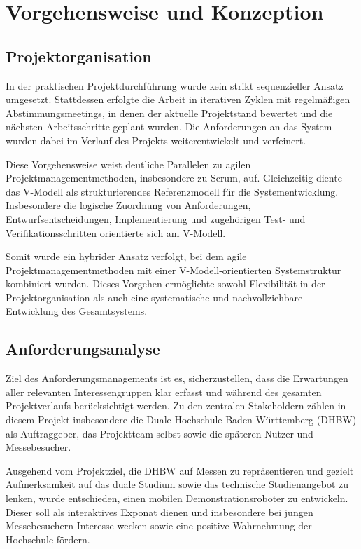 \chapter{Vorgehensweise und Konzeption}
\label{cha:Vorgehensweise und Konzeption}

\section{Projektorganisation}
\label{cha:Projektorganisation}

In der praktischen Projektdurchführung wurde kein strikt sequenzieller Ansatz umgesetzt. Stattdessen erfolgte die Arbeit in iterativen Zyklen mit regelmäßigen Abstimmungsmeetings, in denen der aktuelle Projektstand bewertet und die nächsten Arbeitsschritte geplant wurden. Die Anforderungen an das System wurden dabei im Verlauf des Projekts weiterentwickelt und verfeinert.

Diese Vorgehensweise weist deutliche Parallelen zu agilen Projektmanagementmethoden, insbesondere zu Scrum, auf. Gleichzeitig diente das V-Modell als strukturierendes Referenzmodell für die Systementwicklung. Insbesondere die logische Zuordnung von Anforderungen, Entwurfsentscheidungen, Implementierung und zugehörigen Test- und Verifikationsschritten orientierte sich am V-Modell.

Somit wurde ein hybrider Ansatz verfolgt, bei dem agile Projektmanagementmethoden mit einer V-Modell-orientierten Systemstruktur kombiniert wurden. Dieses Vorgehen ermöglichte sowohl Flexibilität in der Projektorganisation als auch eine systematische und nachvollziehbare Entwicklung des Gesamtsystems. 

\section{Anforderungsanalyse}
\label{cha:Anforderungsanalyse}

Ziel des Anforderungsmanagements ist es, sicherzustellen, dass die Erwartungen aller relevanten Interessengruppen klar erfasst und während des gesamten Projektverlaufs berücksichtigt werden. Zu den zentralen Stakeholdern zählen in diesem Projekt insbesondere die Duale Hochschule Baden-Württemberg (DHBW) als Auftraggeber, das Projektteam selbst sowie die späteren Nutzer und Messebesucher.

Ausgehend vom Projektziel, die DHBW auf Messen zu repräsentieren und gezielt Aufmerksamkeit auf das duale Studium sowie das technische Studienangebot zu lenken, wurde entschieden, einen mobilen Demonstrationsroboter zu entwickeln. Dieser soll als interaktives Exponat dienen und insbesondere bei jungen Messebesuchern Interesse wecken sowie eine positive Wahrnehmung der Hochschule fördern.

